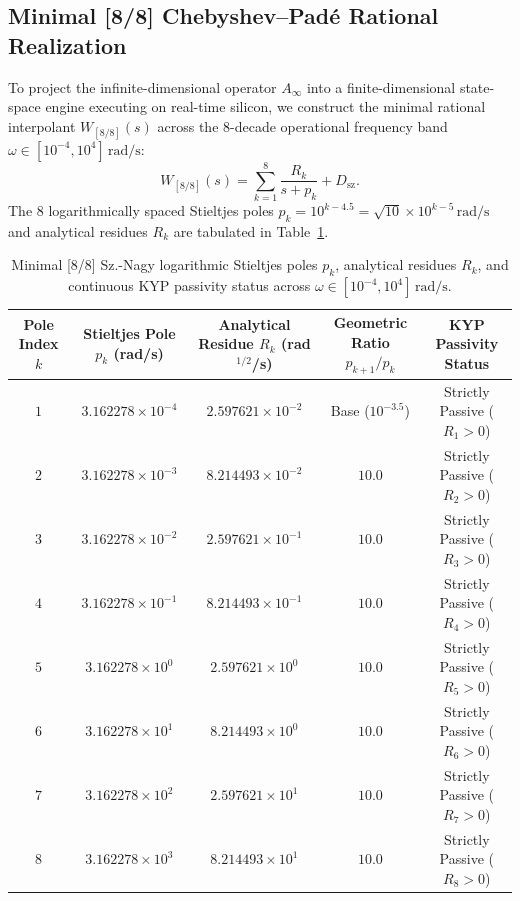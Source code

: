 \documentclass[11pt,a4paper,reqno]{article}
\theoremstyle{plain}
\theoremstyle{definition}
\theoremstyle{remark}
\numberwithin{equation}{section}
\begin{document}
\subsection{Minimal [8/8] Chebyshev--Pad\'{e} Rational Realization}
To project the infinite-dimensional operator $A_\infty$ into a finite-dimensional state-space engine executing on real-time silicon, we construct the minimal rational interpolant $W_{[8/8]}(s)$ across the 8-decade operational frequency band $\omega \in [10^{-4}, 10^4]\,\mathrm{rad/s}$:
\begin{equation}
  W_{[8/8]}(s) = \sum_{k=1}^8 \frac{R_k}{s + p_k} + D_{\mathrm{sz}}.
  \label{eq:rational_pade}
\end{equation}
The 8 logarithmically spaced Stieltjes poles $p_k = 10^{k - 4.5} = \sqrt{10} \times 10^{k-5}\,\mathrm{rad/s}$ and analytical residues $R_k$ are tabulated in Table~\ref{tab:sz_nagy_poles_vol1}.

\begin{table}[htbp]
\centering
\caption{Minimal [8/8] Sz.-Nagy logarithmic Stieltjes poles $p_k$, analytical residues $R_k$, and continuous KYP passivity status across $\omega \in [10^{-4}, 10^4]\,\mathrm{rad/s}$.}
\label{tab:sz_nagy_poles_vol1}
\vspace{0.4em}
\small
\setlength{\tabcolsep}{3pt}
\begin{tabular}{ccccc}
\toprule
\shortstack{Pole Index\\$k$} & \shortstack{Stieltjes Pole\\$p_k$ (rad/s)} & \shortstack{Analytical Residue\\$R_k$ (rad$^{1/2}$/s)} & \shortstack{Geometric Ratio\\$p_{k+1}/p_k$} & \shortstack{KYP Passivity\\Status} \\
\midrule
$1$ & $3.162278 \times 10^{-4}$ & $2.597621 \times 10^{-2}$ & Base ($10^{-3.5}$) & Strictly Passive ($R_1 > 0$) \\
$2$ & $3.162278 \times 10^{-3}$ & $8.214493 \times 10^{-2}$ & $10.0$ & Strictly Passive ($R_2 > 0$) \\
$3$ & $3.162278 \times 10^{-2}$ & $2.597621 \times 10^{-1}$ & $10.0$ & Strictly Passive ($R_3 > 0$) \\
$4$ & $3.162278 \times 10^{-1}$ & $8.214493 \times 10^{-1}$ & $10.0$ & Strictly Passive ($R_4 > 0$) \\
$5$ & $3.162278 \times 10^{0}$  & $2.597621 \times 10^{0}$  & $10.0$ & Strictly Passive ($R_5 > 0$) \\
$6$ & $3.162278 \times 10^{1}$  & $8.214493 \times 10^{0}$  & $10.0$ & Strictly Passive ($R_6 > 0$) \\
$7$ & $3.162278 \times 10^{2}$  & $2.597621 \times 10^{1}$  & $10.0$ & Strictly Passive ($R_7 > 0$) \\
$8$ & $3.162278 \times 10^{3}$  & $8.214493 \times 10^{1}$  & $10.0$ & Strictly Passive ($R_8 > 0$) \\
\bottomrule
\end{tabular}
\end{table}
\end{document}
